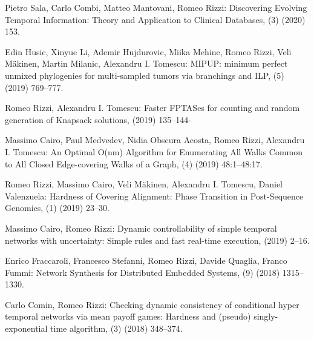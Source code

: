 \begin{etaremune}
  \item {\sc Pietro Sala, Carlo Combi, Matteo Mantovani, Romeo Rizzi:}
   \newblock Discovering Evolving Temporal Information: Theory and Application to Clinical Databases,
   (3) (2020) 153.
   
  \item {\sc Edin Husic, Xinyue Li, Ademir Hujdurovic, Miika Mehine, Romeo Rizzi, Veli Mäkinen, Martin Milanic, Alexandru I. Tomescu:}
   \newblock MIPUP: minimum perfect unmixed phylogenies for multi-sampled tumors via branchings and ILP,
   (5) (2019) 769--777.
   
  \item {\sc Romeo Rizzi, Alexandru I. Tomescu:}
   \newblock Faster FPTASes for counting and random generation of Knapsack solutions,
    (2019) 135--144-
   
  \item {\sc Massimo Cairo, Paul Medvedev, Nidia Obscura Acosta, Romeo Rizzi, Alexandru I. Tomescu:}
   \newblock An Optimal O(nm) Algorithm for Enumerating All Walks Common to All Closed Edge-covering Walks of a Graph,
   (4) (2019) 48:1--48:17.
   
  \item {\sc Romeo Rizzi, Massimo Cairo, Veli Mäkinen, Alexandru I. Tomescu, Daniel Valenzuela:}
   \newblock Hardness of Covering Alignment: Phase Transition in Post-Sequence Genomics,
   (1) (2019) 23--30.
   
  \item {\sc Massimo Cairo, Romeo Rizzi:}
   \newblock Dynamic controllability of simple temporal networks with uncertainty: Simple rules and fast real-time execution,
    (2019) 2--16.
    
  \item {\sc Enrico Fraccaroli, Francesco Stefanni, Romeo Rizzi, Davide Quaglia, Franco Fummi:}
   \newblock Network Synthesis for Distributed Embedded Systems,
   (9) (2018) 1315--1330.

  \item {\sc Carlo Comin, Romeo Rizzi:}
   \newblock Checking dynamic consistency of conditional hyper temporal networks via mean payoff games: Hardness and (pseudo) singly-exponential time algorithm,
   (3) (2018) 348--374.


\end{etaremune}

